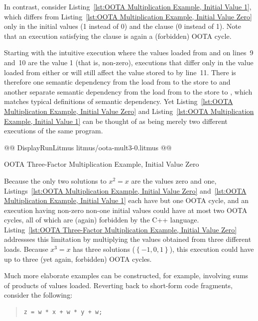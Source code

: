 \documentclass[10]{article}
\begin{document}
In contrast, consider
Listing~\ref{lst:OOTA Multiplication Example, Initial Value 1},
which differs from
Listing~\ref{lst:OOTA Multiplication Example, Initial Value Zero}
only in the initial values (1 instead of 0) and the 
clause (0 instead of 1).
Note that an execution satisfying the  clause is again
a (forbidden) OOTA cycle.

Starting with the intuitive execution where the values loaded from 
and  on lines~9 and~10 are the value 1 (that is, non-zero), executions
that differ only in the value loaded from either  or  will
still affect the value stored to  by line~11.
There is therefore one semantic dependency from the load from 
to the store to  and another separate semantic dependency from
the load from  to the store to , which matches typical
definitions of semantic dependency.
Yet
Listing~\ref{lst:OOTA Multiplication Example, Initial Value Zero}
and
Listing~\ref{lst:OOTA Multiplication Example, Initial Value 1}
can be thought of as being merely two different executions of the same
program.

\begin{listing}[tbp]
@@ DisplayRunLitmus litmus/oota-mult3-0.litmus @@
\caption{OOTA Three-Factor Multiplication Example, Initial Value Zero}
\label{lst:OOTA Three-Factor Multiplication Example, Initial Value Zero}
\end{listing}

Because the only two solutions to $x^2 = x$ are the values zero and one,
Listings~\ref{lst:OOTA Multiplication Example, Initial Value Zero}
and~\ref{lst:OOTA Multiplication Example, Initial Value 1}
each have but one OOTA cycle, and an execution having non-zero non-one
initial values could have at most two OOTA cycles, all of which are
(again) forbidden by the C++ language.
Listing~\ref{lst:OOTA Three-Factor Multiplication Example, Initial Value Zero}
addressses this limitation by multiplying the values obtained from three
different loads.
Because $x^3 = x$ has three solutions ($\left\{ -1, 0, 1 \right\}$),
this execution could have up to three (yet again, forbidden) OOTA cycles.

Much more elaborate examples can be constructed, for example,
involving sums of products of values loaded.
Reverting back to short-form code fragments, consider the following:

\begin{quote}
\begin{verbatim}
z = w * x + w * y + w;
\end{verbatim}
\end{quote}
\end{document}
